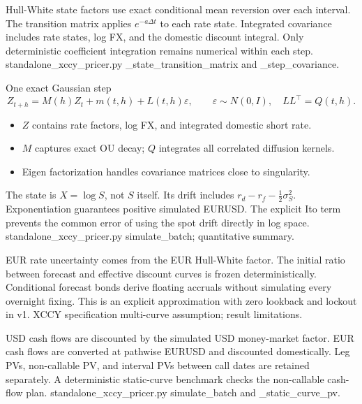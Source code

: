 {Hull-White state factors use exact conditional mean reversion over each interval.}
{The transition matrix applies $e^{-a\Delta t}$ to each rate state.}
{Integrated covariance includes rate states, log FX, and the domestic discount integral.}
{Only deterministic coefficient integration remains numerical within each step.}
{standalone\_xccy\_pricer.py \_state\_transition\_matrix and \_step\_covariance.}

\begin{frame}{One exact Gaussian step}
  \[
    Z_{t+h}=M(h)Z_t+m(t,h)+L(t,h)\varepsilon,
    \qquad \varepsilon\sim N(0,I),\quad LL^\top=Q(t,h).
  \]
  \begin{itemize}\setlength\itemsep{0.8em}
    \item $Z$ contains rate factors, log FX, and integrated domestic short rate.
    \item $M$ captures exact OU decay; $Q$ integrates all correlated diffusion kernels.
    \item Eigen factorization handles covariance matrices close to singularity.
  \end{itemize}
\end{frame}

{The state is $X=\log S$, not $S$ itself.}
{Its drift includes $r_d-r_f-\tfrac12\sigma_S^2$.}
{Exponentiation guarantees positive simulated EURUSD.}
{The explicit Ito term prevents the common error of using the spot drift directly in log space.}
{standalone\_xccy\_pricer.py simulate\_batch; quantitative summary.}

{EUR rate uncertainty comes from the EUR Hull-White factor.}
{The initial ratio between forecast and effective discount curves is frozen deterministically.}
{Conditional forecast bonds derive floating accruals without simulating every overnight fixing.}
{This is an explicit approximation with zero lookback and lockout in v1.}
{XCCY specification multi-curve assumption; result limitations.}

{USD cash flows are discounted by the simulated USD money-market factor.}
{EUR cash flows are converted at pathwise EURUSD and discounted domestically.}
{Leg PVs, non-callable PV, and interval PVs between call dates are retained separately.}
{A deterministic static-curve benchmark checks the non-callable cash-flow plan.}
{standalone\_xccy\_pricer.py simulate\_batch and \_static\_curve\_pv.}

